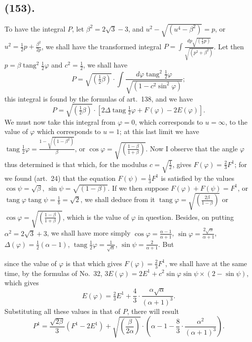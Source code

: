\documentclass{article}
\begin{document}
\subsection*{(153).}

To have the integral $P$, let $\beta^{2}=2\sqrt{3}-3$, and $u^{2}-\sqrt{(u^{4}-\beta^{2})}=p$, or $u^{2}=\frac{1}{2}p+\frac{\beta^{2}}{2p}$, we shall have the transformed integral $P=\displaystyle\int\frac{dp\sqrt{(\frac{1}{2}p)}}{\sqrt{(p^{2}+\beta^{2})}}$. Let then $p=\beta\operatorname{tang}^{2}\frac{1}{2}\varphi$ and $c^{2}=\frac{1}{2}$, we shall have
\[ P=\sqrt{(\tfrac{1}{2}\beta)}\cdot\int\frac{d\varphi\operatorname{tang}^{2}\tfrac{1}{2}\varphi}{\sqrt{(1-c^{2}\sin^{2}\varphi)}}; \]
this integral is found by the formulas of art.\ 138, and we have
\[ P=\sqrt{(\tfrac{1}{2}\beta)}\cdot[2\Delta\operatorname{tang}\tfrac{1}{2}\varphi+F(\varphi)-2E(\varphi)]. \]
We must now take this integral from $\varphi=0$, which corresponds to $u=\infty$, to the value of $\varphi$ which corresponds to $u=1$; at this last limit we have $\operatorname{tang}\frac{1}{2}\varphi=\frac{1-\sqrt{(1-\beta^{2})}}{\beta}$, or $\cos\varphi=\sqrt{\left(\frac{1-\beta}{1+\beta}\right)}$. Now I observe that the angle $\varphi$ thus determined is that which, for the modulus $c=\sqrt{\frac{1}{2}}$, gives $F(\varphi)=\frac{2}{3}F^{1}$; for we found (art.\ 24) that the equation $F(\psi)=\frac{1}{3}F^{1}$ is satisfied by the values $\cos\psi=\sqrt{\beta}$, $\sin\psi=\sqrt{(1-\beta)}$. If we then suppose $F(\varphi)+F(\psi)=F^{1}$, or $\operatorname{tang}\varphi\operatorname{tang}\psi=\frac{1}{b}=\sqrt{2}$, we shall deduce from it $\operatorname{tang}\varphi=\sqrt{\left(\frac{2\beta}{1-\beta}\right)}$ or $\cos\varphi=\sqrt{\left(\frac{1-\beta}{1+\beta}\right)}$, which is the value of $\varphi$ in question. Besides, on putting $\alpha^{2}=2\sqrt{3}+3$, we shall have more simply $\cos\varphi=\frac{\alpha-1}{\alpha+1}$, $\sin\varphi=\frac{2\sqrt{\alpha}}{\alpha+1}$, $\Delta(\varphi)=\frac{1}{2}(\alpha-1)$, $\operatorname{tang}\frac{1}{2}\varphi=\frac{1}{\sqrt{\alpha}}$, $\sin\psi=\frac{2}{\alpha+1}$. But

since the value of $\varphi$ is that which gives $F(\varphi)=\frac{2}{3}F^{1}$, we shall have at the same time, by the formulas of No.~32, $3E(\varphi)=2E^{1}+c^{2}\sin\varphi\sin\psi\times(2-\sin\psi)$, which gives
\[ E(\varphi)=\tfrac{2}{3}E^{1}+\frac{4}{3}\cdot\frac{\alpha\sqrt{\alpha}}{(\alpha+1)^{3}}. \]
Substituting all these values in that of $P$, there will result
\[ P^{1}=\frac{\sqrt{2\beta}}{3}(F^{1}-2E^{1})+\sqrt{\left(\frac{\beta}{2\alpha}\right)}\cdot\left(\alpha-1-\frac{8}{3}\cdot\frac{\alpha^{2}}{(\alpha+1)^{3}}\right). \]
\end{document}
